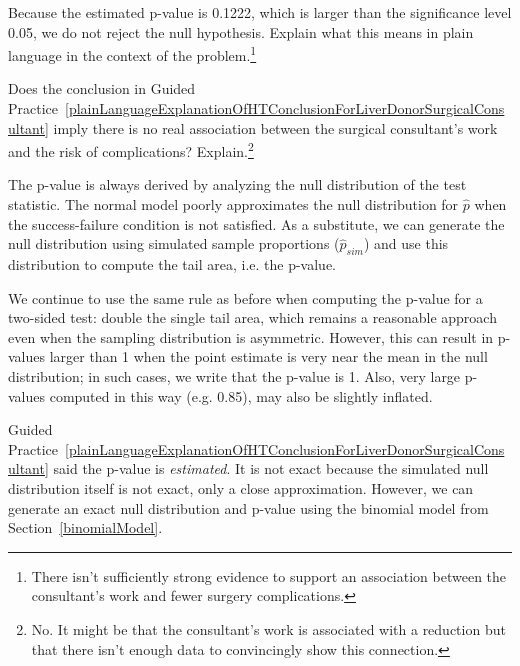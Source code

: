 \begin{exercise} \label{plainLanguageExplanationOfHTConclusionForLiverDonorSurgicalConsultant}
Because the estimated p-value is 0.1222, which is larger than the significance level 0.05, we do not reject the null hypothesis. Explain what this means in plain language in the context of the problem.\footnote{There isn't sufficiently strong evidence to support an association between the consultant's work and fewer surgery complications.}
\end{exercise}

\textC{\newpage}

\begin{exercise}
Does the conclusion in Guided Practice~\ref{plainLanguageExplanationOfHTConclusionForLiverDonorSurgicalConsultant} imply there is no real association between the surgical consultant's work and the risk of complications? Explain.\footnote{No. It might be that the consultant's work is associated with a reduction but that there isn't enough data to convincingly show this connection.}
\end{exercise}

\begin{termBox}{
The p-value is always derived by analyzing the null distribution of the test statistic. The normal model poorly approximates the null distribution for $\hat{p}$ when the success-failure condition is not satisfied. As a substitute, we can generate the null distribution using simulated sample proportions ($\hat{p}_{sim}$) and use this distribution to compute the tail area, i.e. the p-value.}
\end{termBox}

We continue to use the same rule as before when computing the p-value for a two-sided test: double the single tail area, which remains a reasonable approach even when the sampling distribution is asymmetric. However, this can result in p-values larger than 1 when the point estimate is very near the mean in the null distribution; in such cases, we write that the p-value is 1. Also, very large p-values computed in this way (e.g. 0.85), may also be slightly inflated.

Guided Practice~\ref{plainLanguageExplanationOfHTConclusionForLiverDonorSurgicalConsultant} said the p-value is \emph{estimated}. It is not exact because the simulated null distribution itself is not exact, only a close approximation. However, we can generate an exact null distribution and p-value using the binomial model from Section~\ref{binomialModel}.

